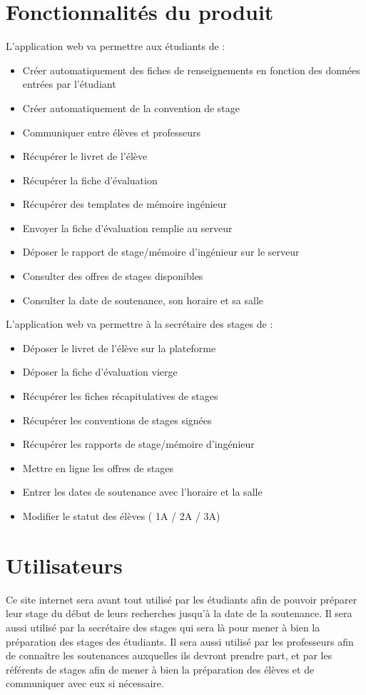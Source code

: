 \documentclass{scrreprt}
\begin{document}
\section{Fonctionnalités du produit}
L'application web va permettre aux étudiants de :
\begin{itemize}[label=\textbullet]
	\item Créer automatiquement des fiches de renseignements en fonction des données entrées par l'étudiant
	\item Créer automatiquement de la convention de stage
	\item Communiquer entre élèves et professeurs
	\item Récupérer le livret de l'élève
	\item Récupérer la fiche d'évaluation
	\item Récupérer des templates de mémoire ingénieur
	\item Envoyer la fiche d'évaluation remplie au serveur
	\item Déposer le rapport de stage/mémoire d'ingénieur sur le serveur
	\item Consulter des offres de stages disponibles
	\item Consulter la date de soutenance, son horaire et sa salle
\end{itemize}

L'application web va permettre à la secrétaire des stages de :
\begin{itemize}[label=\textbullet]
	\item Déposer le livret de l'élève sur la plateforme
	\item Déposer la fiche d'évaluation vierge
	\item Récupérer les fiches récapitulatives de stages
	\item Récupérer les conventions de stages signées
	\item Récupérer les rapports de stage/mémoire d'ingénieur
	\item Mettre en ligne les offres de stages
	\item Entrer les dates de soutenance avec l'horaire et la salle
	\item Modifier le statut des élèves ( 1A / 2A / 3A)
	
\end{itemize}
	
\vspace{3cm}

\section{Utilisateurs}
\hspace{1cm}Ce site internet sera avant tout utilisé par les étudiants afin de pouvoir préparer leur stage du début de leurs recherches jusqu'à la date de la soutenance. Il sera aussi utilisé par la secrétaire des stages qui sera là pour mener à bien la préparation des stages des étudiants. Il sera aussi utilisé par les professeurs afin de connaître les soutenances auxquelles ils devront prendre part, et par les référents de stages afin de mener à bien la préparation des élèves et de communiquer avec eux si nécessaire.\\
\end{document}
